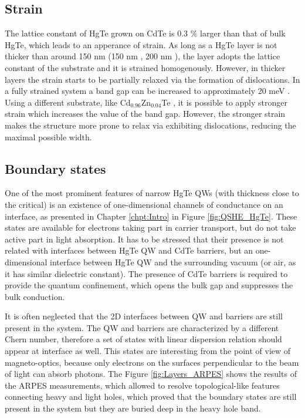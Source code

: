 \documentclass[titlepage,a4paper]{book}
\newcommand{\wciecie}{\quad\phantom{v}}
\begin{document}
\subsection{Strain}
\wciecie
The lattice constant of HgTe grown on CdTe is 0.3 \% larger than that of bulk HgTe, which leads to an apperance of strain. As long as a HgTe layer is not thicker than around 150 nm (150 nm \cite{Crauste_StrainedMCT}, 200 nm \cite{Brune_State2}), the layer adopts the lattice constant of the substrate and it is strained homogenously. However, in thicker layers the strain starts to be partially relaxed via the formation of dislocations. In a fully strained system a band gap can be increased to approximately 20 meV \cite{Brune_State2}\cite{Crauste_StrainedMCT}. Using a different substrate, like Cd$_{0.96}$Zn$_{0.04}$Te \cite{Leubner_State}, it is possible to apply stronger strain which increases the value of the band gap. However, the stronger strain makes the structure more prone to relax via exhibiting dislocations, reducing the maximal possible width.

\subsection{Boundary states}
\wciecie
One of the most prominent features of narrow HgTe QWs (with thickness close to the critical) is an existence of one-dimensional channels of conductance on an interface, as presented in Chapter \ref{chpt:Intro} in Figure \ref{fig:QSHE_HgTe}. These states are available for electrons taking part in carrier transport, but do not take active part in light absorption. It has to be stressed that their presence is not related with interfaces between HgTe QW and CdTe barriers, but an one-dimensional interface between HgTe QW and the surrounding vacuum (or air, as it has similar dielectric constant). The presence of CdTe barriers is required to provide the quantum confinement, which opens the bulk gap and suppresses the bulk conduction. 

It is often neglected that the 2D interfaces between QW and barriers are still present in the system. The QW and barriers are characterized by a different Chern number, therefore a set of states with linear dispersion relation should appear at interface as well. This states are interesting from the point of view of magneto-optics, because only electrons on the surfaces perpendicular to the beam of light can absorb photons. The Figure \ref{fig:Layers_ARPES} shows the results of the ARPES measurements, which allowed to resolve topological-like features connecting heavy and light holes, which proved that the boundary states are still present in the system but they are buried deep in the heavy hole band. 
\end{document}
